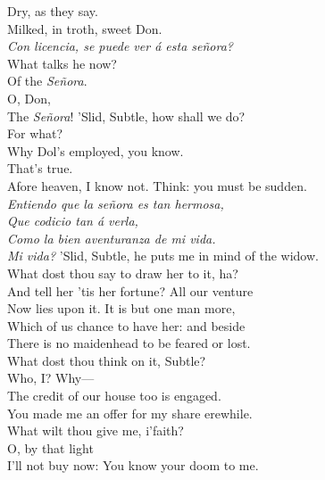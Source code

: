 \documentclass[a4paper,oneside,12pt]{memoir}
\begin{document}
\begin{drama*}
Dry, as they say.\\
\facespeaks {} Milked, in troth, sweet Don.\\
\surlyspeaks \emph{Con licencia, se puede ver \'{a} esta se\~{n}ora?}\\
\subtlespeaks What talks he now?\\
\facespeaks {} Of the \emph{Se\~{n}ora}.\\
\subtlespeaks {} O, Don,\\
The \emph{Se\~{n}ora}!
\facespeaks {} 'Slid, Subtle, how shall we do?\\
\subtlespeaks For what?\\
\facespeaks {} Why Dol's employed, you know.\\
\subtlespeaks {} That's true.\\
Afore heaven, I know not.
\facespeaks {} Think: you must be sudden.\\
\surlyspeaks \emph{Entiendo que la se\~{n}ora es tan hermosa,\\
Que codicio tan \'{a} verla,\\
Como la bien aventuranza de mi vida.}\\
\facespeaks \emph{Mi vida?} 'Slid, Subtle, he puts me in mind of the widow.\\
What dost thou say to draw her to it, ha?\\
And tell her 'tis her fortune? All our venture\\
Now lies upon it. It is but one man more,\\
Which of us chance to have her: and beside\\
There is no maidenhead to be feared or lost.\\
What dost thou think on it, Subtle?\\
\subtlespeaks {} Who, I? Why---\\
\facespeaks The credit of our house too is engaged.\\
\subtlespeaks You made me an offer for my share erewhile.\\
What wilt thou give me, i'faith?\\
\facespeaks {} O, by that light\\
I'll not buy now: You know your doom to me.\\

\end{drama*}
\end{document}
